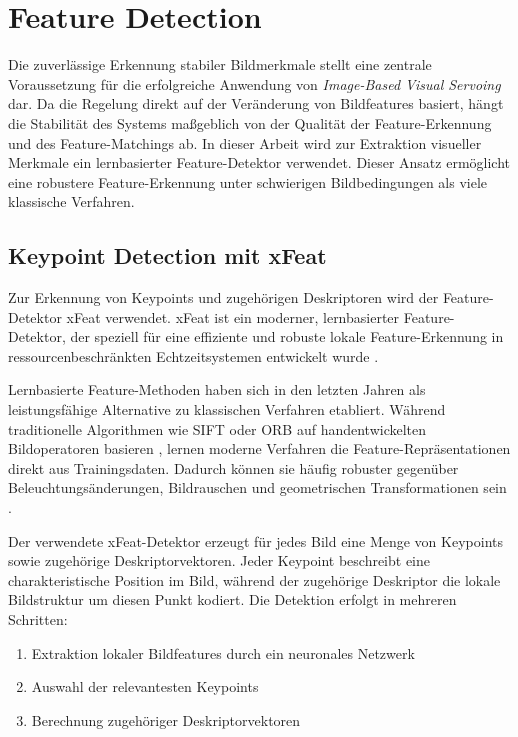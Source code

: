 \section{Feature Detection}
\label{sec:feature_detection}

Die zuverlässige Erkennung stabiler Bildmerkmale stellt eine zentrale Voraussetzung für die erfolgreiche Anwendung von \textit{Image-Based Visual Servoing} dar. Da die Regelung direkt auf der Veränderung von Bildfeatures basiert, hängt die Stabilität des Systems maßgeblich von der Qualität der Feature-Erkennung und des Feature-Matchings ab. In dieser Arbeit wird zur Extraktion visueller Merkmale ein lernbasierter Feature-Detektor verwendet. Dieser Ansatz ermöglicht eine robustere Feature-Erkennung unter schwierigen Bildbedingungen als viele klassische Verfahren.

\subsection{Keypoint Detection mit xFeat}
\label{subsec:keypoint_detection_xfeat}

Zur Erkennung von Keypoints und zugehörigen Deskriptoren wird der Feature-Detektor xFeat verwendet. xFeat ist ein moderner, lernbasierter Feature-Detektor, der speziell für eine effiziente und robuste lokale Feature-Erkennung in ressourcenbeschränkten Echtzeitsystemen entwickelt wurde \cite{potje2024xfeat}.

Lernbasierte Feature-Methoden haben sich in den letzten Jahren als leistungsfähige Alternative zu klassischen Verfahren etabliert. Während traditionelle Algorithmen wie \ac{SIFT} oder \ac{ORB} auf handentwickelten Bildoperatoren basieren \cite{lowe2004sift, rublee2011orb}, lernen moderne Verfahren die Feature-Repräsentationen direkt aus Trainingsdaten. Dadurch können sie häufig robuster gegenüber Beleuchtungsänderungen, Bildrauschen und geometrischen Transformationen sein \cite{potje2024xfeat, detone2018superpoint, sarlin2020superglue}.

Der verwendete xFeat-Detektor erzeugt für jedes Bild eine Menge von Keypoints sowie zugehörige Deskriptorvektoren. Jeder Keypoint beschreibt eine charakteristische Position im Bild, während der zugehörige Deskriptor die lokale Bildstruktur um diesen Punkt kodiert. Die Detektion erfolgt in mehreren Schritten:

\begin{enumerate}
	\item Extraktion lokaler Bildfeatures durch ein neuronales Netzwerk
	\item Auswahl der relevantesten Keypoints
	\item Berechnung zugehöriger Deskriptorvektoren
\end{enumerate}

